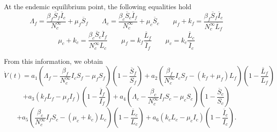 \documentclass[preprint,12pt]{elsarticle}
\begin{document}
\noindent At the endemic equilibrium point, the following equalities hold
$$\Lambda_f=\frac{\beta_f\overline{S}_f\overline{I}_c}{N_c^{\infty}}+\mu_f\overline{S}_f \qquad \Lambda_c=\frac{\beta_c\overline{S}_c\overline{I}_f}{N_c^{\infty}}+\mu_c\overline{S}_c \qquad \mu_f+k_f=\frac{\beta_f\overline{S}_f\overline{I}_c}{N_c^{\infty}\overline{L}_f}$$
\begin{equation}\label{endemic_equalities}
\mu_c+k_c=\frac{\beta_c\overline{S}_c\overline{I}_f}{N_c^{\infty}\overline{L}_c} \qquad \mu_f=k_f\frac{\overline{L}_f}{\overline{I}_f} \qquad \mu_c= k_c\frac{\overline{L}_c}{\overline{I}_c}
\end{equation}

\noindent From this information, we obtain
$$\dot{V}(t)=a_1\left(\Lambda_f-\frac{\beta_f}{N_c^{\infty}}I_cS_f-\mu_fS_f\right)\left(1-\frac{\overline{S}_f}{S_f}\right)+a_2\left(\frac{\beta_f}{N_c^{\infty}}I_cS_f-\left(k_f+\mu_f\right)L_f\right)\left(1-\frac{\overline{L}_f}{L_f}\right)$$
$$+a_3\left(k_f L_f-\mu_fI_f\right)\left(1-\frac{\overline{I}_f}{I_f}\right)+a_4\left(\Lambda_c-\frac{\beta_c}{N_c^{\infty}}I_fS_c-\mu_cS_c\right)\left(1-\frac{\overline{S}_c}{S_c}\right)$$
$$+a_5\left(\frac{\beta_c}{N_c^{\infty}}I_fS_c-\left(\mu_c+k_c\right)L_c\right)\left(1-\frac{\overline{L}_c}{L_c}\right)+a_6\left(k_c L_c-\mu_cI_c\right)\left(1-\frac{\overline{I}_c}{I_c}\right).$$
\end{document}
